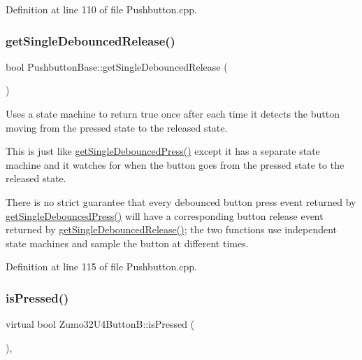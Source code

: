 Definition at line 110 of file Pushbutton.\+cpp.

\mbox{\label{class_pushbutton_base_ae568f5db0e8804247e0dcab72a311d42}} 
\subsubsection{\texorpdfstring{get\+Single\+Debounced\+Release()}{getSingleDebouncedRelease()}}
{\footnotesize\ttfamily bool Pushbutton\+Base\+::get\+Single\+Debounced\+Release (\begin{DoxyParamCaption}{ }\end{DoxyParamCaption})\hspace{0.3cm}{\ttfamily [inherited]}}



Uses a state machine to return true once after each time it detects the button moving from the pressed state to the released state. 

This is just like \hyperlink{class_pushbutton_base_a93953875c8b1c5f69dec3984774de296}{get\+Single\+Debounced\+Press()} except it has a separate state machine and it watches for when the button goes from the pressed state to the released state.

There is no strict guarantee that every debounced button press event returned by \hyperlink{class_pushbutton_base_a93953875c8b1c5f69dec3984774de296}{get\+Single\+Debounced\+Press()} will have a corresponding button release event returned by \hyperlink{class_pushbutton_base_ae568f5db0e8804247e0dcab72a311d42}{get\+Single\+Debounced\+Release()}; the two functions use independent state machines and sample the button at different times. 

Definition at line 115 of file Pushbutton.\+cpp.

\mbox{\label{class_zumo32_u4_button_b_a013a2c0029356aece18b93963373a736}} 
\subsubsection{\texorpdfstring{is\+Pressed()}{isPressed()}}
{\footnotesize\ttfamily virtual bool Zumo32\+U4\+Button\+B\+::is\+Pressed (\begin{DoxyParamCaption}{ }\end{DoxyParamCaption})\hspace{0.3cm}{\ttfamily [inline]}, {\ttfamily [virtual]}}



